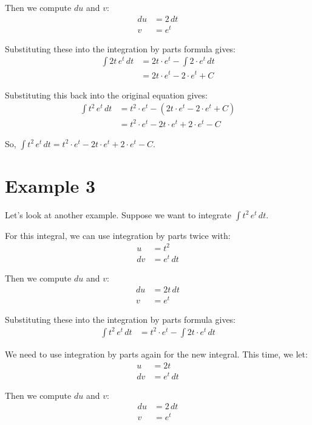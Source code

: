 \documentclass{article}
\begin{document}
Then we compute $du$ and $v$:
\begin{align*}
    du &= 2 \, dt \\
    v &= e^t
\end{align*}

Substituting these into the integration by parts formula gives:
\begin{align*}
    \int 2t \, e^t \, dt &= 2t \cdot e^t - \int 2 \cdot e^t \, dt \\
    &= 2t \cdot e^t - 2 \cdot e^t + C
\end{align*}

Substituting this back into the original equation gives:
\begin{align*}
    \int t^2 \, e^t \, dt &= t^2 \cdot e^t - (2t \cdot e^t - 2 \cdot e^t + C) \\
    &= t^2 \cdot e^t - 2t \cdot e^t + 2 \cdot e^t - C
\end{align*}

So, $\int t^2 \, e^t \, dt = t^2 \cdot e^t - 2t \cdot e^t + 2 \cdot e^t - C$.

\section{Example 3}

Let's look at another example. Suppose we want to integrate $\int t^2 \, e^t \, dt$.

For this integral, we can use integration by parts twice with:
\begin{align*}
    u &= t^2 \\
    dv &= e^t \, dt
\end{align*}

Then we compute $du$ and $v$:
\begin{align*}
    du &= 2t \, dt \\
    v &= e^t
\end{align*}

Substituting these into the integration by parts formula gives:
\begin{align*}
    \int t^2 \, e^t \, dt &= t^2 \cdot e^t - \int 2t \cdot e^t \, dt
\end{align*}

We need to use integration by parts again for the new integral. This time, we let:
\begin{align*}
    u &= 2t \\
    dv &= e^t \, dt
\end{align*}

Then we compute $du$ and $v$:
\begin{align*}
    du &= 2 \, dt \\
    v &= e^t
\end{align*}
\end{document}
